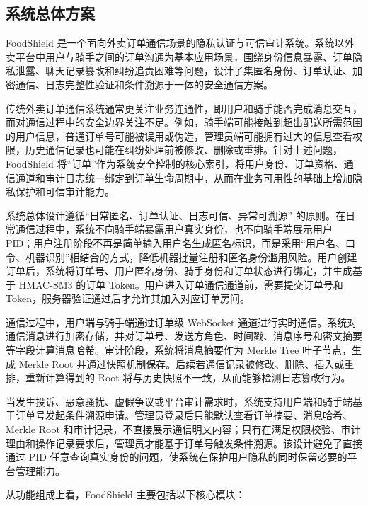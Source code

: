 \subsection{系统总体方案}

FoodShield 是一个面向外卖订单通信场景的隐私认证与可信审计系统。系统以外卖平台中用户与骑手之间的订单沟通为基本应用场景，围绕身份信息暴露、订单隐私泄露、聊天记录篡改和纠纷追责困难等问题，设计了集匿名身份、订单认证、加密通信、日志完整性验证和条件溯源于一体的安全通信方案。

传统外卖订单通信系统通常更关注业务连通性，即用户和骑手能否完成消息交互，而对通信过程中的安全边界关注不足。例如，骑手端可能接触到超出配送所需范围的用户信息，普通订单号可能被误用或伪造，管理员端可能拥有过大的信息查看权限，历史通信记录也可能在纠纷处理前被修改、删除或重排。针对上述问题，FoodShield 将“订单”作为系统安全控制的核心索引，将用户身份、订单资格、通信通道和审计日志统一绑定到订单生命周期中，从而在业务可用性的基础上增加隐私保护和可信审计能力。

系统总体设计遵循“日常匿名、订单认证、日志可信、异常可溯源” 的原则。在日常通信过程中，系统不向骑手端暴露用户真实身份，也不向骑手端展示用户 PID；用户注册阶段不再是简单输入用户名生成匿名标识，而是采用“用户名、口令、机器识别”相结合的方式，降低机器批量注册和匿名身份滥用风险。用户创建订单后，系统将订单号、用户匿名身份、骑手身份和订单状态进行绑定，并生成基于 HMAC-SM3 的订单 Token。用户进入订单通信通道前，需要提交订单号和 Token，服务器验证通过后才允许其加入对应订单房间。

通信过程中，用户端与骑手端通过订单级 WebSocket 通道进行实时通信。系统对通信消息进行加密存储，并对订单号、发送方角色、时间戳、消息序号和密文摘要等字段计算消息哈希。审计阶段，系统将消息摘要作为 Merkle Tree 叶子节点，生成 Merkle Root 并通过快照机制保存。后续若通信记录被修改、删除、插入或重排，重新计算得到的 Root 将与历史快照不一致，从而能够检测日志篡改行为。

当发生投诉、恶意骚扰、虚假争议或平台审计需求时，系统支持用户端和骑手端基于订单号发起条件溯源申请。管理员登录后只能默认查看订单摘要、消息哈希、Merkle Root 和审计记录，不直接展示通信明文内容；只有在满足权限校验、审计理由和操作记录要求后，管理员才能基于订单号触发条件溯源。该设计避免了直接通过 PID 任意查询真实身份的问题，使系统在保护用户隐私的同时保留必要的平台管理能力。

从功能组成上看，FoodShield 主要包括以下核心模块：

